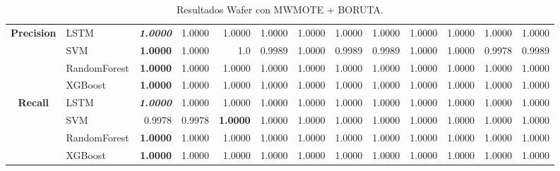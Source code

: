 \begin{table}[H]
\begin{adjustbox}{max width=13cm}
\begin{tabular}{|c|l|r|r|r|r|r|r|r|r|r|r|r|}
			\hline
			\textbf{Precision} &  LSTM & \textit{ \textbf{  1.0000 } } &  1.0000 &  1.0000 &  1.0000 &  1.0000 &  1.0000 &  1.0000 &  1.0000 &  1.0000 &  1.0000 &  1.0000 \\
			&  SVM & \textbf{  1.0000 } &  1.0000 &  1.0 &  0.9989 &  1.0000 &  0.9989 &  0.9989 &  1.0000 &  1.0000 &  0.9978 &  0.9989 \\
			&  RandomForest & \textbf{  1.0000 } &  1.0000 &  1.0000 &  1.0000 &  1.0000 &  1.0000 &  1.0000 &  1.0000 &  1.0000 &  1.0000 &  1.0000 \\
			&  XGBoost & \textbf{  1.0000 } &  1.0000 &  1.0000 &  1.0000 &  1.0000 &  1.0000 &  1.0000 &  1.0000 &  1.0000 &  1.0000 &  1.0000 \\
			\hline
			\textbf{Recall} &  LSTM & \textit{ \textbf{  1.0000 } } &  1.0000 &  1.0000 &  1.0000 &  1.0000 &  1.0000 &  1.0000 &  1.0000 &  1.0000 &  1.0000 &  1.0000 \\
			&  SVM &  0.9978 &  0.9978 & \textbf{  1.0000 } &  1.0000 &  1.0000 &  1.0000 &  1.0000 &  1.0000 &  1.0000 &  1.0000 &  1.0000 \\
			&  RandomForest & \textbf{  1.0000 } &  1.0000 &  1.0000 &  1.0000 &  1.0000 &  1.0000 &  1.0000 &  1.0000 &  1.0000 &  1.0000 &  1.0000 \\
			&  XGBoost & \textbf{  1.0000 } &  1.0000 &  1.0000 &  1.0000 &  1.0000 &  1.0000 &  1.0000 &  1.0000 &  1.0000 &  1.0000 &  1.0000 \\
			\hline
		\end{tabular}
	\end{adjustbox}
	\caption{Resultados Wafer con MWMOTE + BORUTA.}
	\label{tab:Wafer_MWMOTE_BORUTA}
\end{table}
